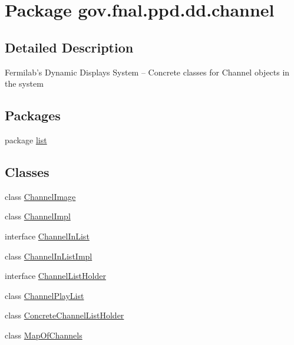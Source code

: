 \hypertarget{namespacegov_1_1fnal_1_1ppd_1_1dd_1_1channel}{\section{Package gov.\-fnal.\-ppd.\-dd.\-channel}
\label{namespacegov_1_1fnal_1_1ppd_1_1dd_1_1channel}
}


\subsection{Detailed Description}
Fermilab's Dynamic Displays System -- Concrete classes for Channel objects in the system\subsection*{Packages}
\begin{DoxyCompactItemize}
\item 
package \hyperlink{namespacegov_1_1fnal_1_1ppd_1_1dd_1_1channel_1_1list}{list}
\end{DoxyCompactItemize}
\subsection*{Classes}
\begin{DoxyCompactItemize}
\item 
class \hyperlink{classgov_1_1fnal_1_1ppd_1_1dd_1_1channel_1_1ChannelImage}{Channel\-Image}
\item 
class \hyperlink{classgov_1_1fnal_1_1ppd_1_1dd_1_1channel_1_1ChannelImpl}{Channel\-Impl}
\item 
interface \hyperlink{interfacegov_1_1fnal_1_1ppd_1_1dd_1_1channel_1_1ChannelInList}{Channel\-In\-List}
\item 
class \hyperlink{classgov_1_1fnal_1_1ppd_1_1dd_1_1channel_1_1ChannelInListImpl}{Channel\-In\-List\-Impl}
\item 
interface \hyperlink{interfacegov_1_1fnal_1_1ppd_1_1dd_1_1channel_1_1ChannelListHolder}{Channel\-List\-Holder}
\item 
class \hyperlink{classgov_1_1fnal_1_1ppd_1_1dd_1_1channel_1_1ChannelPlayList}{Channel\-Play\-List}
\item 
class \hyperlink{classgov_1_1fnal_1_1ppd_1_1dd_1_1channel_1_1ConcreteChannelListHolder}{Concrete\-Channel\-List\-Holder}
\item 
class \hyperlink{classgov_1_1fnal_1_1ppd_1_1dd_1_1channel_1_1MapOfChannels}{Map\-Of\-Channels}
\end{DoxyCompactItemize}
